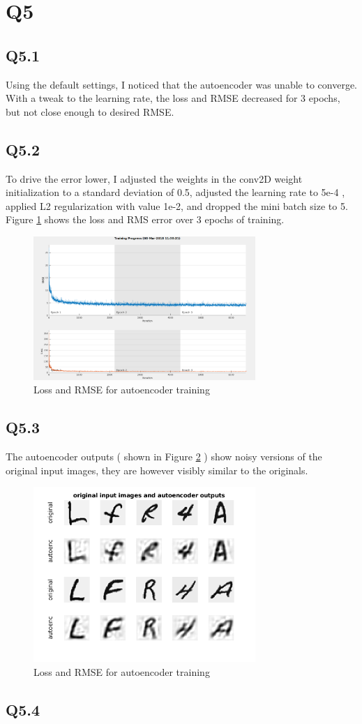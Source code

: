 \documentclass[12pt]{article}
\begin{document}
\section{Q5}
\subsection{Q5.1}
Using the default settings, I noticed that the autoencoder was unable to converge. With a tweak to the learning rate, the loss and RMSE decreased for 3 epochs, but not close enough to desired RMSE. 

\subsection{Q5.2}
To drive the error lower, I adjusted the weights in the conv2D weight initialization to a standard deviation of 0.5, adjusted the learning rate to 5e-4 , applied L2 regularization with value 1e-2, and dropped the mini batch size to 5. Figure \ref{fig:nist36confusion} shows the loss and RMS error over 3 epochs of training.

\begin{figure}[H]
\centering
\includegraphics[page=1,width=0.75\textwidth]{q522_mrse4}
\caption{ Loss and RMSE for autoencoder training } 
\label{fig:nist36confusion}
\end{figure}   

\subsection{Q5.3}
The autoencoder outputs ( shown in Figure \ref{fig:autoencout} ) show noisy versions of the original input images, they are however visibly similar to the originals.

\begin{figure}[H]
\centering
\includegraphics[page=1,width=0.75\textwidth]{q531_auto}
\caption{ Loss and RMSE for autoencoder training } 
\label{fig:autoencout}
\end{figure}   

\subsection{Q5.4}
\end{document}
